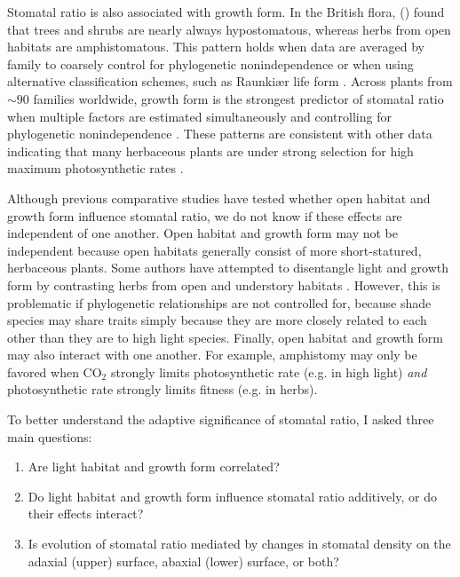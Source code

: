 \documentclass[12pt, oneside]{article}
\begin{document}
Stomatal ratio is also associated with growth form. In the British flora, \citeauthor{Salisbury_1927} (\citeyear{Salisbury_1927}) found that trees and shrubs are nearly always hypostomatous, whereas herbs from open habitats are amphistomatous. This pattern holds when data are averaged by family to coarsely control for phylogenetic nonindependence \citep{Peat_Fitter_1994b} or when using alternative classification schemes, such as Raunki\ae r life form \citep{Peat_Fitter_1994b}. Across plants from $\sim 90$ families worldwide, growth form is the strongest predictor of stomatal ratio when multiple factors are estimated simultaneously and controlling for phylogenetic nonindependence \citep{Muir_2015}. These patterns are consistent with other data indicating that many herbaceous plants are under strong selection for high maximum photosynthetic rates \citep{Bazzaz_1979, Korner_etal_1989, Wullschleger_1993}.

Although previous comparative studies have tested whether open habitat and growth form influence stomatal ratio, we do not know if these effects are independent of one another. Open habitat and growth form may not be independent because open habitats generally consist of more short-statured, herbaceous plants. Some authors have attempted to disentangle light and growth form by contrasting herbs from open and understory habitats \citep{Salisbury_1927}. However, this is problematic if phylogenetic relationships are not controlled for, because shade species may share traits simply because they are more closely related to each other than they are to high light species. Finally, open habitat and growth form may also interact with one another. For example, amphistomy may only be favored when CO$_2$ strongly limits photosynthetic rate (e.g. in high light) \textit{and} photosynthetic rate strongly limits fitness (e.g. in herbs).

To better understand the adaptive significance of stomatal ratio, I asked three main questions:

\begin{enumerate}

  \item{Are light habitat and growth form correlated?}
  \item{Do light habitat and growth form influence stomatal ratio additively, or do their effects interact?}
  \item{Is evolution of stomatal ratio mediated by changes in stomatal density on the adaxial (upper) surface, abaxial (lower) surface, or both?}
  
\end{enumerate}
\end{document}
